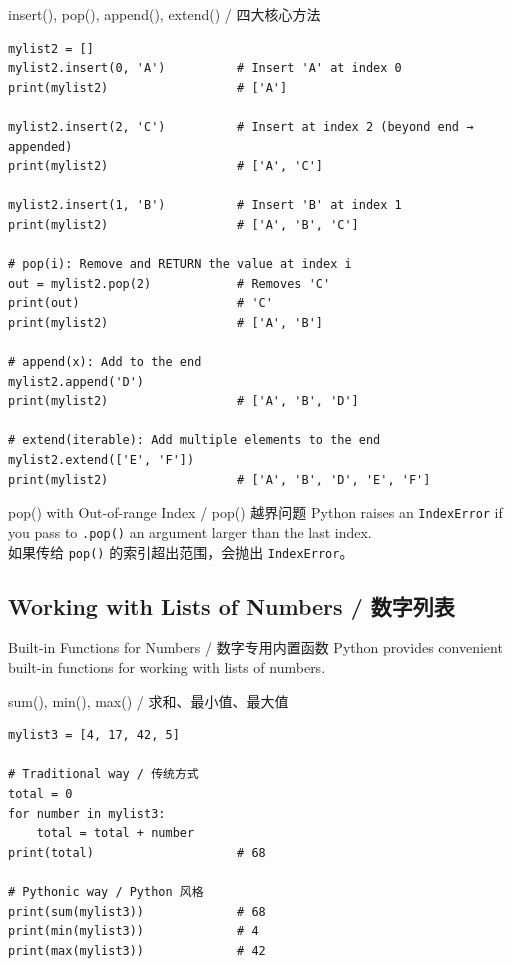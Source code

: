 \documentclass[11pt,a4paper]{report}
\let\oldtexttt\texttt
\renewcommand{\texttt}[1]{\textcolor{mainblue}{\oldtexttt{#1}}}
\begin{document}
\begin{examplebox}{insert(), pop(), append(), extend() / 四大核心方法}
\begin{lstlisting}
mylist2 = []
mylist2.insert(0, 'A')          # Insert 'A' at index 0
print(mylist2)                  # ['A']

mylist2.insert(2, 'C')          # Insert at index 2 (beyond end → appended)
print(mylist2)                  # ['A', 'C']

mylist2.insert(1, 'B')          # Insert 'B' at index 1
print(mylist2)                  # ['A', 'B', 'C']

# pop(i): Remove and RETURN the value at index i
out = mylist2.pop(2)            # Removes 'C'
print(out)                      # 'C'
print(mylist2)                  # ['A', 'B']

# append(x): Add to the end
mylist2.append('D')
print(mylist2)                  # ['A', 'B', 'D']

# extend(iterable): Add multiple elements to the end
mylist2.extend(['E', 'F'])
print(mylist2)                  # ['A', 'B', 'D', 'E', 'F']
\end{lstlisting}
\end{examplebox}

\begin{warning}{pop() with Out-of-range Index / pop() 越界问题}
    Python raises an \texttt{IndexError} if you pass to \texttt{.pop()} an argument larger than the last index. \\
    如果传给 \texttt{pop()} 的索引超出范围，会抛出 \texttt{IndexError}。
\end{warning}

\subsection{Working with Lists of Numbers / 数字列表}

\begin{concept}{Built-in Functions for Numbers / 数字专用内置函数}
    Python provides convenient built-in functions for working with lists of numbers.
\end{concept}

\begin{examplebox}{sum(), min(), max() / 求和、最小值、最大值}
\begin{lstlisting}
mylist3 = [4, 17, 42, 5]

# Traditional way / 传统方式
total = 0
for number in mylist3:
    total = total + number
print(total)                    # 68

# Pythonic way / Python 风格
print(sum(mylist3))             # 68
print(min(mylist3))             # 4
print(max(mylist3))             # 42
\end{lstlisting}
\end{examplebox}
\end{document}
